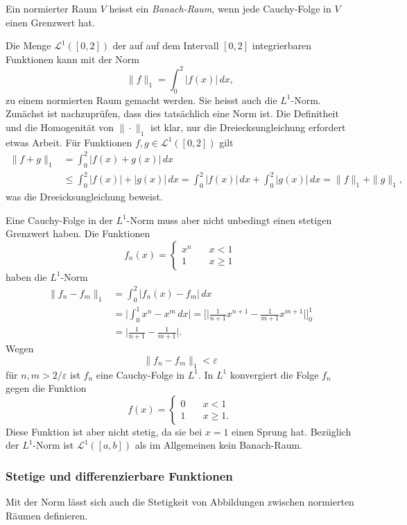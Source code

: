 \begin{definition}
Ein normierter Raum $V$ heisst ein {\em Banach-Raum},
%
wenn jede Cauchy-Folge in $V$ einen Grenzwert hat.
\end{definition}

\begin{beispiel}
Die Menge $\mathscr{L}^1([0,2])$
der auf auf dem Intervall $[0,2]$ integrierbaren Funktionen kann mit der Norm
\[
\|f\|_1
=
\int_0^2 |f(x)|\,dx,
\]
zu einem normierten Raum gemacht werden.
Sie heisst auch die $L^1$-Norm.
%
Zunächst ist nachzuprüfen, dass dies tatsächlich eine Norm ist.
Die Definitheit und die Homogenität von $\|\cdot\|_1$ ist klar, nur
die Dreiecksungleichung erfordert etwas Arbeit.
Für Funktionen $f,g\in \mathscr{L}^1([0,2])$ gilt
\begin{align*}
\|f+g\|_1
&=
\int_0^2 |f(x)+g(x)|\,dx
\\
&\le 
\int_0^2 |f(x)|+|g(x)|\,dx
=
\int_0^2 |f(x)|\,dx
+
\int_0^2 |g(x)|\,dx
=
\|f\|_1+\|g\|_1,
\end{align*}
was die Dreeicksungleichung beweist.

Eine Cauchy-Folge in der $L^1$-Norm muss aber nicht unbedingt einen
stetigen Grenzwert haben.
Die Funktionen
\[
f_n(x) =
\begin{cases}
x^n&\quad x< 1\\
1&\quad x\ge 1
\end{cases}
\]
haben die $L^1$-Norm
\begin{align*}
\|f_n-f_m\|_1
&=
\int_0^2 |f_n(x)-f_m|\,dx
\\
&=
\biggl|\int_0^1 x^n-x^m\,dx\biggr|
=
\biggl[
\biggl|
\frac{1}{n+1}x^{n+1}
-
\frac{1}{m+1}x^{m+1}
\biggr|
\biggr]_0^1
\\
&=
\biggl|
\frac{1}{n+1}
-
\frac{1}{m+1}\biggr|.
\end{align*}
Wegen
\[
\|f_n-f_m\|_1
<\varepsilon
\]
für $n,m>2/\varepsilon$ ist $f_n$ eine Cauchy-Folge in $L^1$.
In $L^1$ konvergiert die Folge $f_n$ gegen die Funktion
\[
f(x)
=
\begin{cases}
0&\quad x< 1\\
1&\quad x\ge 1.
\end{cases}
\]
Diese Funktion ist aber nicht stetig, da sie bei $x=1$ einen
Sprung hat.
Bezüglich der $L^1$-Norm ist $\mathscr{L}^1([a,b])$ als im Allgemeinen
kein Banach-Raum.
\end{beispiel}

%
%
\subsubsection{Stetige und differenzierbare Funktionen}
Mit der Norm lässt sich auch die Stetigkeit von Abbildungen zwischen
normierten Räumen definieren.

